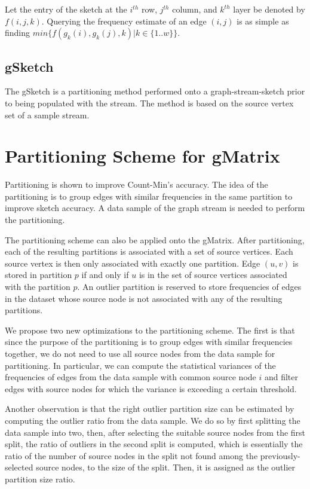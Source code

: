Let the entry of the sketch at the $i^{th}$ row, $j^{th}$ column, and $k^{th}$ layer be denoted by $f(i,j,k)$. Querying the frequency estimate of an edge $(i,j)$ is as simple as finding $min\{f(g_k(i),g_k(j),k)|k \in \{1..w\}\}$.

\subsection{gSketch}
The gSketch\cite{DBLP} is a partitioning method performed onto a graph-stream-sketch prior to being populated with the stream. The method is based on the source vertex set of a sample stream.

\section{Partitioning Scheme for gMatrix}

Partitioning\cite{DBLP} is shown to improve Count-Min's\cite{DBLP}\cite{cormode2005improved} accuracy. The idea of the partitioning is to group edges with similar frequencies in the same partition to improve sketch accuracy. A data sample of the graph stream is needed to perform the partitioning.

The partitioning scheme can also be applied onto the gMatrix. After partitioning, each of the resulting partitions is associated with a set of source vertices. Each source vertex is then only associated with exactly one partition. Edge $(u,v)$ is stored in partition $p$ if and only if $u$ is in the set of source vertices associated with the partition $p$. An outlier partition is reserved to store frequencies of edges in the dataset whose source node is not associated with any of the resulting partitions.

We propose two new optimizations to the partitioning scheme. The first is that since the purpose of the partitioning is to group edges with similar frequencies together, we do not need to use all source nodes from the data sample for partitioning. In particular, we can compute the statistical variances of the frequencies of edges from the data sample with common source node $i$ and filter edges with source nodes for which the variance is exceeding a certain threshold.

Another observation is that the right outlier partition size can be estimated by computing the outlier ratio from the data sample. We do so by first splitting the data sample into two, then, after selecting the suitable source nodes from the first split, the ratio of outliers in the second split is computed, which is essentially the ratio of the number of source nodes in the split not found among the previously-selected source nodes, to the size of the split. Then, it is assigned as the outlier partition size ratio.

